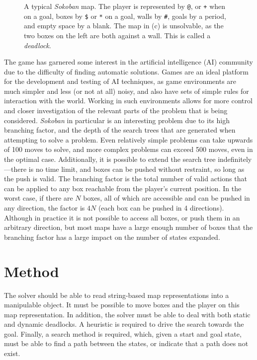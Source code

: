\documentclass[a4paper,11pt]{article}
\begin{document}
\begin{figure}
  \caption{A typical \emph{Sokoban} map. The player is represented by \texttt{@}, or \texttt{+} when on a goal, boxes by \texttt{\$} or \texttt{*} on a goal, walls by \texttt{\#}, goals by a period, and empty space by a blank. The map in (c) is unsolvable, as the two boxes on the left are both against a wall. This is called a \emph{deadlock}.}
  \label{fig:mapex}
\end{figure}

The game has garnered some interest in the artificial intelligence (AI)
community due to the difficulty of finding automatic solutions. Games are an
ideal platform for the development and testing of AI techniques, as game
environments are much simpler and less (or not at all) noisy, and also have sets
of simple rules for interaction with the world. Working in such environments
allows for more control and closer investigation of the relevant parts of the
problem that is being considered. \emph{Sokoban} in particular is an interesting
problem due to its high branching factor, and the depth of the search trees that
are generated when attempting to solve a problem. Even relatively simple
problems can take upwards of 100 moves to solve, and more complex problems can
exceed 500 moves, even in the optimal case. Additionally, it is possible to
extend the search tree indefinitely---there is no time limit, and boxes can be
pushed without restraint, so long as the push is valid. The branching factor is
the total number of valid actions that can be applied to any box reachable from
the player's current position. In the worst case, if there are $N$ boxes, all of
which are accessible and can be pushed in any direction, the factor is $4N$
(each box can be pushed in 4 directions). Although in practice it is not
possible to access all boxes, or push them in an arbitrary direction, but most
maps have a large enough number of boxes that the branching factor has a large
impact on the number of states expanded.

\section{Method}

The solver should be able to read string-based map representations into a
manipulable object. It must be possible to move boxes and the player on this map
representation. In addition, the solver must be able to deal with both static
and dynamic deadlocks. A heuristic is required to drive the search towards the
goal. Finally, a search method is required, which, given a start and goal state,
must be able to find a path between the states, or indicate that a path does not
exist.
\end{document}
